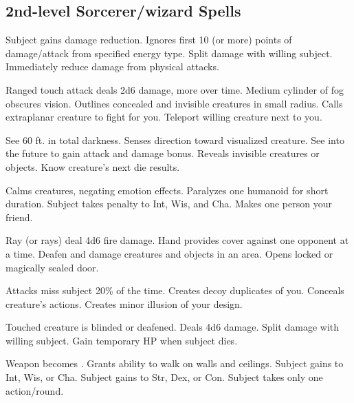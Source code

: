 \subsection{2nd-level Sorcerer/wizard Spells} 
\begin{swspelllist}
   Subject gains damage reduction.
   Ignores first 10 (or more) points of damage/attack from specified energy type.
   Split damage with willing subject.
   Immediately reduce damage from physical attacks.

   Ranged touch attack deals 2d6 damage, more over time.
   Medium cylinder of fog obscures vision.
   Outlines concealed and invisible creatures in small radius.
   Calls extraplanar creature to fight for you.
   Teleport willing creature next to you.

   See 60 ft. in total darkness.
   Senses direction toward visualized creature.
   See into the future to gain attack and damage bonus.
   Reveals invisible creatures or objects.
   Know creature's next die results.

   Calms creatures, negating emotion effects.
   Paralyzes one humanoid for short duration.
   Subject takes  penalty to Int, Wis, and Cha.
   Makes one person your friend.

   Ray (or rays) deal 4d6 fire damage.
   Hand provides cover against one opponent at a time.
   Deafen and damage creatures and objects in an area. 
   Opens locked or magically sealed door.

   Attacks miss subject 20\% of the time.
   Creates decoy duplicates of you.
   Conceals creature's actions. 
   Creates minor illusion of your design.

   Touched creature is blinded or deafened.
   Deals 4d6 damage.
   Split damage with willing subject.
   Gain temporary HP when subject dies.

   Weapon becomes .
   Grants ability to walk on walls and ceilings.
   Subject gains  to Int, Wis, or Cha.
   Subject gains  to Str, Dex, or Con.
   Subject takes only one action/round.
\end{swspelllist}

